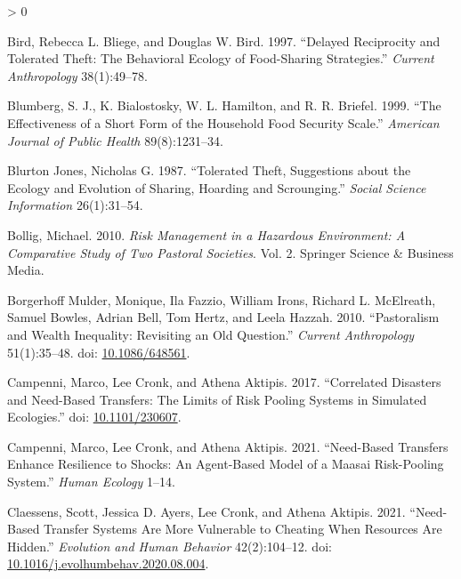 \documentclass[
]{article}
\newlength{\cslhangindent}
\newenvironment{CSLReferences}[2] %
 {%
  \setlength{\parindent}{0pt}
  \ifodd #1 \everypar{\setlength{\hangindent}{\cslhangindent}}\ignorespaces\fi
  \ifnum #2 > 0
  \setlength{\parskip}{#2\baselineskip}
  \fi
 }%
 {}
\begin{document}
\begin{CSLReferences}{1}{0}
\leavevmode\hypertarget{ref-bird1997delayed}{}%
Bird, Rebecca L. Bliege, and Douglas W. Bird. 1997. {``Delayed Reciprocity and Tolerated Theft: The Behavioral Ecology of Food-Sharing Strategies.''} \emph{Current Anthropology} 38(1):49--78.

\leavevmode\hypertarget{ref-blumbergEffectivenessShortForm1999}{}%
Blumberg, S. J., K. Bialostosky, W. L. Hamilton, and R. R. Briefel. 1999. {``The Effectiveness of a Short Form of the {Household Food Security Scale}.''} \emph{American Journal of Public Health} 89(8):1231--34.

\leavevmode\hypertarget{ref-blurton1987tolerated}{}%
Blurton Jones, Nicholas G. 1987. {``Tolerated Theft, Suggestions about the Ecology and Evolution of Sharing, Hoarding and Scrounging.''} \emph{Social Science Information} 26(1):31--54.

\leavevmode\hypertarget{ref-bolligRiskManagementHazardous2010}{}%
Bollig, Michael. 2010. \emph{Risk Management in a Hazardous Environment: {A} Comparative Study of Two Pastoral Societies}. Vol. 2. {Springer Science \& Business Media}.

\leavevmode\hypertarget{ref-borgerhoffmulderPastoralismWealthInequality2010}{}%
Borgerhoff Mulder, Monique, Ila Fazzio, William Irons, Richard L. McElreath, Samuel Bowles, Adrian Bell, Tom Hertz, and Leela Hazzah. 2010. {``Pastoralism and {Wealth Inequality}: {Revisiting} an {Old Question}.''} \emph{Current Anthropology} 51(1):35--48. doi: \href{https://doi.org/10.1086/648561}{10.1086/648561}.

\leavevmode\hypertarget{ref-campenniCorrelatedDisastersNeedbased2017}{}%
Campenni, Marco, Lee Cronk, and Athena Aktipis. 2017. {``Correlated Disasters and Need-Based Transfers: {The} Limits of Risk Pooling Systems in Simulated Ecologies.''} doi: \href{https://doi.org/10.1101/230607}{10.1101/230607}.

\leavevmode\hypertarget{ref-campenni2021need}{}%
Campenni, Marco, Lee Cronk, and Athena Aktipis. 2021. {``Need-Based Transfers Enhance Resilience to Shocks: An Agent-Based Model of a Maasai Risk-Pooling System.''} \emph{Human Ecology} 1--14.

\leavevmode\hypertarget{ref-claessensNeedbasedTransferSystems2021}{}%
Claessens, Scott, Jessica D. Ayers, Lee Cronk, and Athena Aktipis. 2021. {``Need-Based Transfer Systems Are More Vulnerable to Cheating When Resources Are Hidden.''} \emph{Evolution and Human Behavior} 42(2):104--12. doi: \href{https://doi.org/10.1016/j.evolhumbehav.2020.08.004}{10.1016/j.evolhumbehav.2020.08.004}.


\end{CSLReferences}
\end{document}
